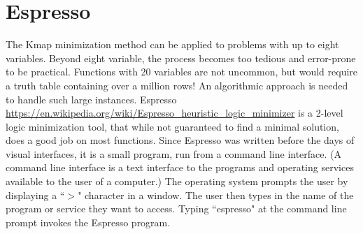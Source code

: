 \section{Espresso}
The Kmap minimization method can be applied to problems with up to
eight variables.  Beyond eight variable, the process becomes too tedious and error-prone to
be practical.  Functions with 20 variables are not uncommon, but
would require a truth table containing over a million rows!  An
algorithmic approach is needed to handle such large instances.
Espresso \url{https://en.wikipedia.org/wiki/Espresso_heuristic_logic_minimizer}
is a 2-level logic minimization tool, that while not
guaranteed to find a minimal solution, does a good job on most
functions.  Since Espresso was written before the days
of visual interfaces, it is a small program, run from a command line interface.
(A command line interface
is a text interface to the programs and operating services
available to the user of a computer.) The operating system prompts
the user by displaying a ``$>$" character in a window. The user
then types in the name of the program or service they want to
access.  Typing ``espresso" at the command
line prompt invokes the Espresso program.

